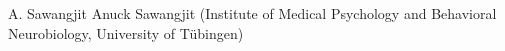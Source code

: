 
                {A. Sawangjit}
                {Anuck Sawangjit (Institute of Medical Psychology and Behavioral Neurobiology, University of Tübingen)}
                